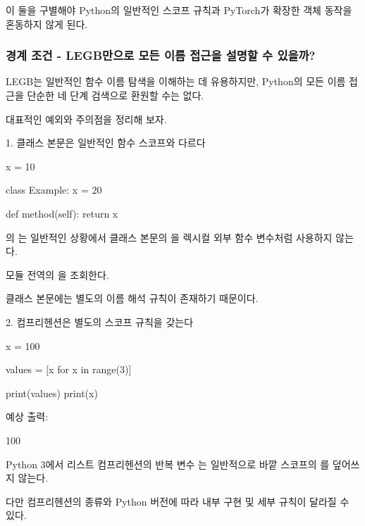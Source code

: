 이 둘을 구별해야 Python의 일반적인 스코프 규칙과 PyTorch가 확장한 객체 동작을 혼동하지 않게 된다.

\subsubsection{경계 조건 - LEGB만으로 모든 이름 접근을 설명할 수 있을까?}

LEGB는 일반적인 함수 이름 탐색을 이해하는 데 유용하지만, Python의 모든 이름 접근을 단순한 네 단계 검색으로 환원할 수는 없다.

대표적인 예외와 주의점을 정리해 보자.

\begin{dhknote}
\begin{dhksmry}[centered]
1. 클래스 본문은 일반적인 함수 스코프와 다르다
\end{dhksmry}
\end{dhknote}

\begin{dhkcode}
x = 10

class Example:
    x = 20

    def method(self):
        return x
\end{dhkcode}

의 는 일반적인 상황에서 클래스 본문의 을 렉시컬 외부 함수 변수처럼 사용하지 않는다.

모듈 전역의 을 조회한다.

클래스 본문에는 별도의 이름 해석 규칙이 존재하기 때문이다.

\begin{dhknote}
\begin{dhksmry}[centered]
2. 컴프리헨션은 별도의 스코프 규칙을 갖는다
\end{dhksmry}
\end{dhknote}

\begin{dhkcode}
x = 100

values = [x for x in range(3)]

print(values)
print(x)
\end{dhkcode}

예상 출력:

\begin{dhkzsh}
[0, 1, 2]
100
\end{dhkzsh}

Python 3에서 리스트 컴프리헨션의 반복 변수 는 일반적으로 바깥 스코프의 를 덮어쓰지 않는다.

다만 컴프리헨션의 종류와 Python 버전에 따라 내부 구현 및 세부 규칙이 달라질 수 있다.


